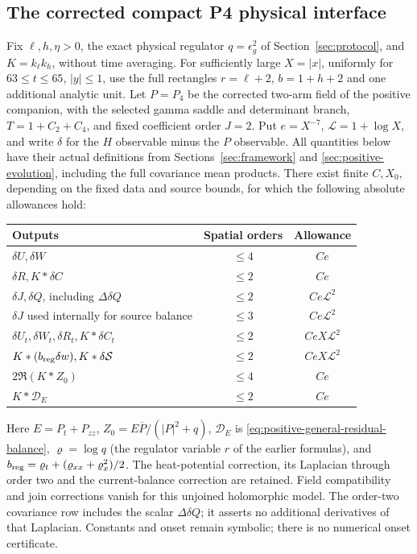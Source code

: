 \subsection{The corrected compact P4 physical interface}
\begin{theorem}
\label{thm:p4-physical-interface}
Fix $\ell,h,\eta>0$, the exact physical regulator $q=\epsilon_g^2$
of Section~\ref{sec:protocol}, and $K=k_\ell k_h$, without time averaging.
For sufficiently large $X=|x|$, uniformly for $63\le t\le65$,
$|y|\le1$, use the full rectangles $r=\ell+2$, $b=1+h+2$ and one
additional analytic unit. Let $P=P_4$ be the corrected two-arm field
of the positive companion, with the selected gamma saddle and determinant
branch, $T=1+C_2+C_4$, and fixed coefficient order $J=2$.
Put $e=X^{-7}$, $\mathcal L=1+\log X$, and write $\delta$ for the
$H$ observable minus the $P$ observable. All quantities below have their
actual definitions from Sections~\ref{sec:framework} and
\ref{sec:positive-evolution}, including the full covariance mean products.
There exist finite $C,X_0$, depending on the fixed data and source bounds,
for which the following absolute allowances hold:
\begin{center}\small
\begin{tabular}{@{}>{\raggedright\arraybackslash}p{}cc@{}}
\toprule Outputs & Spatial orders & Allowance\\\midrule
$\delta U,\delta W$ & $\le4$ & $Ce$\\
$\delta R,K*\delta C$ & $\le2$ & $Ce$\\
$\delta J,\delta Q$, including $\Delta\delta Q$ & $\le2$ & $Ce\mathcal L^2$\\
$\delta J$ used internally for source balance & $\le3$ & $Ce\mathcal L^2$\\
$\delta U_t,\delta W_t,\delta R_t,K*\delta C_t$ & $\le2$ & $CeX\mathcal L^2$\\
$K*(b_{\rm reg}\delta w),K*\delta\mathcal S$ & $\le2$ & $CeX\mathcal L^2$\\
$2\Re(K*Z_0)$ & $\le4$ & $Ce$\\
$K*\mathcal D_E$ & $\le2$ & $Ce$\\\bottomrule
\end{tabular}
\end{center}
Here $E=P_t+P_{zz}$, $Z_0=E\overline P/(|P|^2+q)$,
$\mathcal D_E$ is \eqref{eq:positive-general-residual-balance},
$\varrho=\log q$ (the regulator variable $r$ of the earlier formulas),
and $b_{\rm reg}=\varrho_t+(\varrho_{xx}+\varrho_x^2)/2$.
The heat-potential correction, its Laplacian through order two and the
current-balance correction are retained. Field compatibility and join
corrections vanish for this unjoined holomorphic model. The order-two covariance row includes the scalar $\Delta\delta Q$;
it asserts no additional derivatives of that Laplacian. Constants and
onset remain symbolic; there is no numerical onset certificate.
\end{theorem}
